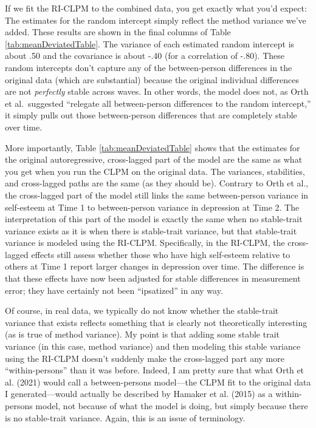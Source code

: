 \documentclass[
  english,
  man,floatsintext]{apa6}
\begin{document}
If we fit the RI-CLPM to the combined data, you get exactly what you'd expect: The estimates for the random intercept simply reflect the method variance we've added. These results are shown in the final columns of Table \ref{tab:meanDeviatedTable}. The variance of each estimated random intercept is about .50 and the covariance is about -.40 (for a correlation of -.80). These random intercepts don't capture any of the between-person differences in the original data (which are substantial) because the original individual differences are not \emph{perfectly} stable across waves. In other words, the model does not, as Orth et al.~suggested ``relegate all between-person differences to the random intercept,'' it simply pulls out those between-person differences that are completely stable over time.

More importantly, Table \ref{tab:meanDeviatedTable} shows that the estimates for the original autoregressive, cross-lagged part of the model are the same as what you get when you run the CLPM on the original data. The variances, stabilities, and cross-lagged paths are the same (as they should be). Contrary to Orth et al., the cross-lagged part of the model still links the same between-person variance in self-esteem at Time 1 to between-person variance in depression at Time 2. The interpretation of this part of the model is exactly the same when no stable-trait variance exists as it is when there is stable-trait variance, but that stable-trait variance is modeled using the RI-CLPM. Specifically, in the RI-CLPM, the cross-lagged effects still assess whether those who have high self-esteem relative to others at Time 1 report larger changes in depression over time. The difference is that these effects have now been adjusted for stable differences in measurement error; they have certainly not been ``ipsatized'' in any way.

Of course, in real data, we typically do not know whether the stable-trait variance that exists reflects something that is clearly not theoretically interesting (as is true of method variance). My point is that adding some stable trait variance (in this case, method variance) and then modeling this stable variance using the RI-CLPM doesn't suddenly make the cross-lagged part any more ``within-persons'' than it was before. Indeed, I am pretty sure that what Orth et al. (2021) would call a between-persons model---the CLPM fit to the original data I generated---would actually be described by Hamaker et al. (2015) as a within-persons model, not because of what the model is doing, but simply because there is no stable-trait variance. Again, this is an issue of terminology.
\end{document}

